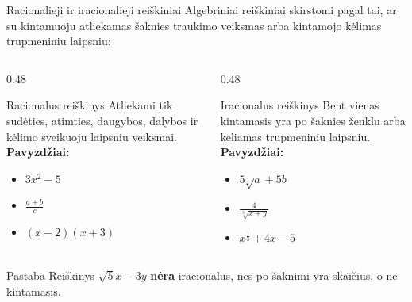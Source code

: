 \documentclass[aspectratio=169, 10pt]{beamer}
\begin{document}
\begin{frame}{Racionalieji ir iracionalieji reiškiniai}
    Algebriniai reiškiniai skirstomi pagal tai, ar su kintamuoju atliekamas šaknies traukimo veiksmas arba kintamojo kėlimas trupmeniniu laipsniu:

    \begin{columns}[T]
        \begin{column}{0.48\textwidth}
            \begin{block}{Racionalus reiškinys}
                Atliekami tik sudėties, atimties, daugybos, dalybos ir kėlimo sveikuoju laipsniu veiksmai.
                \vfill
                \textbf{Pavyzdžiai:}
                \begin{itemize}
                    \item $3x^2 - 5$
                    \item $\frac{a+b}{c}$
                    \item $(x-2)(x+3)$
                \end{itemize}
            \end{block}
        \end{column}

        \begin{column}{0.48\textwidth}
            \begin{block}{Iracionalus reiškinys}
                Bent vienas kintamasis yra po šaknies ženklu arba keliamas trupmeniniu laipsniu.
                \vfill
                \textbf{Pavyzdžiai:}
                \begin{itemize}
                    \item $5\sqrt{a}+5b$
                    \item $\frac{4}{\sqrt[3]{x+y}}$
                    \item $x^{\frac{1}{3}} + 4x - 5$
                \end{itemize}
            \end{block}
        \end{column}
    \end{columns}

    \vspace{0.3cm}
    \begin{alertblock}{Pastaba}
        Reiškinys $\sqrt{5}x-3y$ \textbf{nėra} iracionalus, nes po šaknimi yra skaičius, o ne kintamasis.
    \end{alertblock}
\end{frame}
\end{document}
